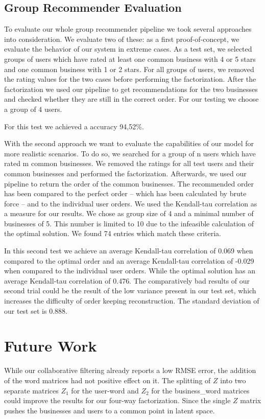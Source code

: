 \documentclass[a4paper]{article}
\begin{document}
\subsection{Group Recommender Evaluation}
To evaluate our whole group recommender pipeline we took several approaches into consideration. We evaluate two of these: as a first proof-of-concept, we evaluate the behavior of our system in extreme cases. As a test set, we selected groups of users which have rated at least one common business with 4 or 5 stars and one common business with 1 or 2 stars. For all groups of users, we removed  the rating values for the two cases before performing the factorization. After the factorization we used our pipeline to get recommendations for the two businesses and checked whether they are still in the correct order. For our testing we choose a group of 4 users.

For this test we achieved a accuracy 94,52\%.

With the second approach we want to evaluate the capabilities of our model for more realistic scenarios. To do so, we searched for a group of n users which have rated m common businesses. We removed the ratings for all test users and their common businesses and performed the factorization. Afterwards, we used our pipeline to return the order of the common businesses. The recommended order has been compared to the perfect order -- which has been calculated by brute force -- and to the individual user orders. We used the Kendall-tau correlation as a measure for our results. We chose as group size of 4 and a minimal number of businesses  of 5. This number is limited to 10 due to the infeasible calculation of the optimal solution. We found 74 entries which match these criteria.

In this second test we achieve an average Kendall-tau correlation of 0.069 when compared to the optimal order and an average Kendall-tau correlation of -0.029 when compared to the individual user orders. While the optimal solution has an average Kendall-tau correlation of 0.476. The comparatively bad results of our second trial could be the result of the low variance present in our test set, which increases the difficulty of order keeping reconstruction. The standard deviation of our test set is 0.888.

\section{Future Work}\label{sec:FutureWork}
While our collaborative filtering already reports a low RMSE error, the addition of the word matrices had not positive effect on it. The splitting of $Z$ into two separate matrices $Z_1$ for the user-word and $Z_2$ for the business_word matrices could improve the results for our four-way factorization. Since the single $Z$ matrix pushes the businesses and users to a common point in latent space.
\end{document}
